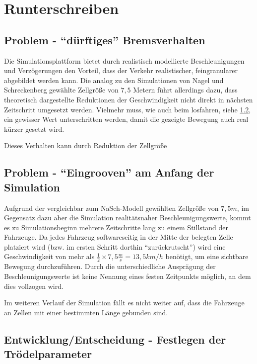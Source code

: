 \section{Runterschreiben}
\label{sec:rusch}



\subsection{Problem - \enquote{dürftiges} Bremsverhalten}

Die Simulationsplattform bietet durch realistisch modellierte Beschleunigungen und Verzögerungen den Vorteil, dass der Verkehr realistischer, feingranularer abgebildet werden kann.
Die analog zu den Simulationen von Nagel und Schreckenberg gewählte Zellgröße von $7,5$ Metern führt allerdings dazu, dass theoretisch dargestellte Reduktionen der Geschwindigkeit nicht direkt in nächsten Zeitschritt umgesetzt werden.
Vielmehr muss, wie auch beim losfahren, siehe \cref{sec:accelerategroove}, ein gewisser Wert unterschritten werden, damit die gezeigte Bewegung auch real kürzer gesetzt wird.

Dieses Verhalten kann durch Reduktion der Zellgröße 



\subsection{Problem - \enquote{Eingrooven} am Anfang der Simulation}
\label{sec:accelerategroove}

Aufgrund der vergleichbar zum NaSch-Modell gewählten Zellgröße von $7,5 m$, im Gegensatz dazu aber die Simulation realitätsnaher Beschleunigungswerte, kommt es zu Simulationsbeginn mehrere Zeitschritte lang zu einem Stillstand der Fahrzeuge.
Da jedes Fahrzeug softwareseitig in der Mitte der belegten Zelle platziert wird (bzw. im ersten Schritt dorthin \enquote{zurückrutscht}) wird eine Geschwindigkeit von mehr als $ \frac{1}{2} \times 7,5 \frac{m}{s} = 13,5 km/h$ benötigt, um eine sichtbare Bewegung durchzuführen.
Durch die unterschiedliche Ausprägung der Beschleunigungswerte ist keine Nennung eines festen Zeitpunkts möglich, an dem dies vollzogen wird.

Im weiteren Verlauf der Simulation fällt es nicht weiter auf, dass die Fahrzeuge an Zellen mit einer bestimmten Länge gebunden sind.



\subsection{Entwicklung/Entscheidung - Festlegen der Trödelparameter}

